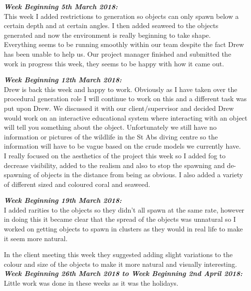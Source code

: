 \documentclass[10pt, a4paper]{article}
\begin{document}
    \textbf{\textit{Week Beginning 5th March 2018:}}\\
    
    This week I added restrictions to generation so objects can only spawn below a certain depth and at certain angles. I then added seaweed to the objects generated and now the environment is really beginning to take shape.\\
    
    Everything seems to be running smoothly within our team despite the fact Drew has been unable to help us. Our project manager finished and submitted the work in progress this week, they seems to be happy with how it came out.
    
    \textbf{\textit{Week Beginning 12th March 2018:}}\\
    Drew is back this week and happy to work. Obviously as I have taken over the procedural generation role I will continue to work on this and a different task was put upon Drew. We discussed it with our client/supervisor and decided Drew would work on an interactive educational system where interacting with an object will tell you something about the object. Unfortunately we still have no information or pictures of the wildlife in the St Abs diving centre so the information will have to be vague based on the crude models we currently have.\\
    
    I really focused on the aesthetics of the project this week so I added fog to decrease visibility, added to the realism and also to stop the spawning and de-spawning of objects in the distance from being as obvious. I also added a variety of different sized and coloured coral and seaweed.
    
    \textbf{\textit{Week Beginning 19th March 2018:}}\\
    I added rarities to the objects so they didn't all spawn at the same rate, however in doing this it became clear that the spread of the objects was unnatural so I worked on getting objects to spawn in clusters as they would in real life to make it seem more natural.
    
    In the client meeting this week they suggested adding slight variations to the colour and size of the objects to make it more natural and visually interesting.
    \textbf{\textit{Week Beginning 26th March 2018 to Week Beginning 2nd April 2018:}}\\
    Little work was done in these weeks as it was the holidays.\\
    
\end{document}
